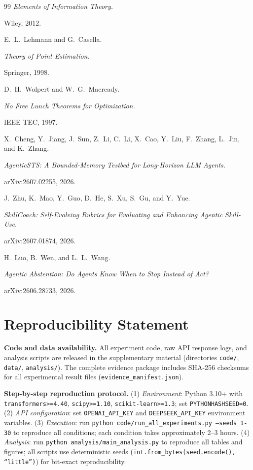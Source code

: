 \documentclass[11pt]{article}
\begin{document}
\begin{thebibliography}{99}
\newblock \textit{Elements of Information Theory.}

\newblock Wiley, 2012.

 E.~L.~Lehmann and G.~Casella.

\newblock \textit{Theory of Point Estimation.}

\newblock Springer, 1998.

 D.~H.~Wolpert and W.~G.~Macready.

\newblock \textit{No Free Lunch Theorems for Optimization.}

\newblock IEEE TEC, 1997.

 X.~Cheng, Y.~Jiang, J.~Sun, Z.~Li, C.~Li, X.~Cao, Y.~Liu, F.~Zhang, L.~Jin, and K.~Zhang.

\newblock \textit{AgenticSTS: A Bounded-Memory Testbed for Long-Horizon LLM Agents.}

\newblock arXiv:2607.02255, 2026.

 J.~Zhu, K.~Mao, Y.~Guo, D.~He, S.~Xu, S.~Gu, and Y.~Yue.

\newblock \textit{SkillCoach: Self-Evolving Rubrics for Evaluating and Enhancing Agentic Skill-Use.}

\newblock arXiv:2607.01874, 2026.

 H.~Luo, B.~Wen, and L.~L.~Wang.

\newblock \textit{Agentic Abstention: Do Agents Know When to Stop Instead of Act?}

\newblock arXiv:2606.28733, 2026.

\end{thebibliography}


\section*{Reproducibility Statement}

\textbf{Code and data availability.} All experiment code, raw API response logs, and analysis scripts are released in the supplementary material (directories \texttt{code/}, \texttt{data/}, \texttt{analysis/}). The complete evidence package includes SHA-256 checksums for all experimental result files (\texttt{evidence\_manifest.json}).

\textbf{Step-by-step reproduction protocol.} (1) \textit{Environment}: Python 3.10+ with \texttt{transformers>=4.40}, \texttt{scipy>=1.10}, \texttt{scikit-learn>=1.3}; set \texttt{PYTHONHASHSEED=0}. (2) \textit{API configuration}: set \texttt{OPENAI\_API\_KEY} and \texttt{DEEPSEEK\_API\_KEY} environment variables. (3) \textit{Execution}: run \texttt{python code/run\_all\_experiments.py --seeds 1-30} to reproduce all conditions; each condition takes approximately 2--3 hours. (4) \textit{Analysis}: run \texttt{python analysis/main\_analysis.py} to reproduce all tables and figures; all scripts use deterministic seeds (\texttt{int.from\_bytes(seed.encode(), ``little'')}) for bit-exact reproducibility.
\end{document}
